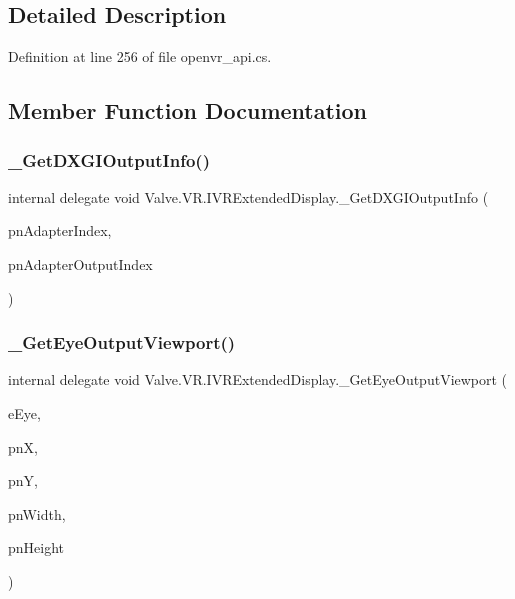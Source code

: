 \subsection{Detailed Description}


Definition at line 256 of file openvr\+\_\+api.\+cs.



\subsection{Member Function Documentation}
\mbox{\label{struct_valve_1_1_v_r_1_1_i_v_r_extended_display_a9d769bf9d8aed92f33ae50770ece270f}} 
\subsubsection{\texorpdfstring{\_GetDXGIOutputInfo()}{\_GetDXGIOutputInfo()}}
{\footnotesize\ttfamily internal delegate void Valve.\+V\+R.\+I\+V\+R\+Extended\+Display.\+\_\+\+Get\+D\+X\+G\+I\+Output\+Info (\begin{DoxyParamCaption}\item[{ref int}]{pn\+Adapter\+Index,  }\item[{ref int}]{pn\+Adapter\+Output\+Index }\end{DoxyParamCaption})}

\mbox{\label{struct_valve_1_1_v_r_1_1_i_v_r_extended_display_a6ef6cdc29a98eecafad06a70ee92e481}} 
\subsubsection{\texorpdfstring{\_GetEyeOutputViewport()}{\_GetEyeOutputViewport()}}
{\footnotesize\ttfamily internal delegate void Valve.\+V\+R.\+I\+V\+R\+Extended\+Display.\+\_\+\+Get\+Eye\+Output\+Viewport (\begin{DoxyParamCaption}\item[{\mbox{\hyperlink{namespace_valve_1_1_v_r_a8153d4a3e627e1cede046327087c1880}{E\+V\+R\+Eye}}}]{e\+Eye,  }\item[{ref uint}]{pnX,  }\item[{ref uint}]{pnY,  }\item[{ref uint}]{pn\+Width,  }\item[{ref uint}]{pn\+Height }\end{DoxyParamCaption})}

